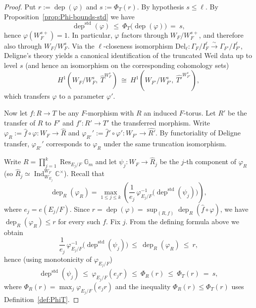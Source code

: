 \documentclass[american]{article}
\numberwithin{equation}{section}
\numberwithin{figure}{section}
\theoremstyle{plain}
\theoremstyle{definition}
\theoremstyle{remark}
\DeclareMathOperator{\dep}{dep}
\DeclareMathOperator{\Res}{Res}
\DeclareMathOperator{\Ind}{Ind}
\DeclareMathOperator{\std}{std}
\newcommand{\CC}{\mathbb{C}}
\newcommand{\Gm}{\mathbb{G}_m}
\newcommand{\Del}{\mathrm{Del}}
\begin{document}
\begin{proof}
Put \(r:=\dep(\varphi)\) and \(s:=\Phi_T(r)\). By hypothesis \(s\le \ell\).
By Proposition~\ref{prop:Phi-bounds-std} we have
\[
\dep^{\std}(\varphi)\ \le\ \Phi_T\!\bigl(\dep(\varphi)\bigr)\ =\ s,
\]
hence \(\varphi(W_F^{s+})=1\). In particular, \(\varphi\) factors through \(W_F/W_F^{s+}\),
and therefore also through \(W_F/W_F^{s}\).
Via the \(\ell\)-closeness isomorphism
\(\Del_{\ell}:\Gamma_F/I_F^{\ell}\xrightarrow{\sim}\Gamma_{F'}/I_{F'}^{\ell}\),
Deligne's theory yields a canonical identification of the truncated Weil data up to level \(s\)
(and hence an isomorphism on the corresponding cohomology sets)
\[
H^1(W_F/W_F^{s},\ \widehat{T}^{W_F^{s}})
\ \cong\
H^1(W_{F'}/W_{F'}^{s},\ \widehat{T'}^{W_{F'}^{s}}),
\]
which transfers \(\varphi\) to a parameter \(\varphi'\).

Now let \(f:R\to T\) be any \(F\)-morphism with \(R\) an induced \(F\)-torus. Let \(R'\) be the
transfer of \(R\) to \(F'\) and \(f':R'\to T'\) the transferred morphism.
Write \(\varphi_R:=\widehat f\circ\varphi:W_F\to\widehat R\) and
\(\varphi_{R'}':=\widehat f'\circ\varphi':W_{F'}\to\widehat{R'}\).
By functoriality of Deligne transfer, \(\varphi_{R'}'\) corresponds to \(\varphi_R\) under the same
truncation isomorphism.

Write \(R=\prod_{j=1}^k \Res_{E_j/F}\Gm\) and let \(\psi_j:W_F\to \widehat R_j\) be the \(j\)-th component
of \(\varphi_R\) (so \(\widehat R_j\simeq \Ind_{W_{E_j}}^{W_F}\CC^\times\)).
Recall that
\[
\dep_R(\varphi_R)
=\max_{1\le j\le k}\left(\frac{1}{e_j}\,\varphi_{E_j/F}^{-1}\bigl(\dep^{\std}(\psi_j)\bigr)\right),
\]
where \(e_j=e(E_j/F)\).
Since \(r=\dep(\varphi)=\sup_{(R,f)}\dep_R(\widehat f\circ\varphi)\), we have \(\dep_R(\varphi_R)\le r\) for every such \(f\).
Fix \(j\). From the defining formula above we obtain
\[
\frac{1}{e_j}\,\varphi_{E_j/F}^{-1}\bigl(\dep^{\std}(\psi_j)\bigr)\ \le\ \dep_R(\varphi_R)\ \le\ r,
\]
hence (using monotonicity of \(\varphi_{E_j/F}\))
\[
\dep^{\std}(\psi_j)\ \le\ \varphi_{E_j/F}(e_j r)\ \le\ \Phi_R(r)\ \le\ \Phi_T(r)\ =\ s,
\]
where \(\Phi_R(r)=\max_j\varphi_{E_j/F}(e_j r)\) and the inequality \(\Phi_R(r)\le \Phi_T(r)\) uses
Definition~\ref{def:PhiT}.


\end{proof}
\end{document}

